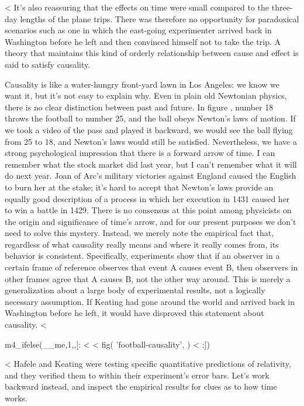 <%
It's also reassuring that the effects on time were
small compared to the three-day lengths of the plane trips. There was therefore no
opportunity for paradoxical scenarios such as one in which the east-going experimenter arrived
back in Washington before he left and then convinced himself not to take the trip.
A theory that maintains this kind of orderly relationship between cause and effect is said to satisfy causality.

Causality is like a water-hungry front-yard lawn in Los Angeles: we know we want it, but it's not easy to explain why.
Even in plain old Newtonian physics, there is no clear distinction between past and future. In figure , number 18
throws the football to number 25, and the ball obeys Newton's laws of motion. If we took a video of the pass and played
it backward, we would see the ball flying from 25 to 18, and Newton's laws would still be satisfied. Nevertheless, we have a strong
psychological impression that there is a forward arrow of time. I can remember what the stock market did last year, but I can't
remember what it will do next year. Joan of Arc's military victories against England caused the English to burn her at the stake;
it's hard to accept that Newton's laws provide an equally good description of a process in which her execution in 1431 caused her to win a battle in 1429.
There is no consensus at this point among physicists on the origin and significance of time's arrow, and for our present purposes
we don't need to solve this mystery. Instead, we merely note the empirical fact that, regardless of what causality really means and
where it really comes from, its behavior is consistent. Specifically, experiments show that if an observer
in a certain frame of reference observes that event A causes event B, then observers in other frames agree
that A causes B, not the other way around. This is merely a generalization about a large body of experimental results, not a logically necessary
assumption. If Keating had gone around the world and arrived back in Washington before he left, it would have disproved
this statement about causality.
<%

m4_ifelse(__me,1,,[: %
<%
<%
  fig(
    'football-causality',
  )
<%
:]) %

<%
Hafele and Keating were testing specific quantitative predictions of relativity, and they verified them to within
their experiment's error bars. Let's work backward instead, and
inspect the empirical results for clues as to how time works.

